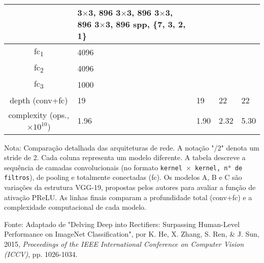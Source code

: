 \begin{table}
\begin{threeparttable}
\begin{tabular}{cllll}
              & \makecell[l]{3$\times$3, 896 \\ 3$\times$3, 896 \\ 3$\times$3, 896 \\ 3$\times$3, 896 \\ \addlinespace spp, \{7, 3, 2, 1\}} \\
            \midrule
            fc\textsubscript{1} & \multicolumn{4}{l}{4096} \\
            fc\textsubscript{2} & \multicolumn{4}{l}{4096} \\
            fc\textsubscript{3} & \multicolumn{4}{l}{1000} \\
            \midrule
            depth (conv+fc) & 19 & 19 & 22 & 22 \\
            complexity (ops., $\times 10^{10}$) & 1.96 & 1.90 & 2.32 & 5.30 \\
            \bottomrule
        \end{tabular}
        
        \begin{tablenotes}[para]
            \small
            \item[] Nota: Comparação detalhada das arquiteturas de rede. A notação "/2" denota um stride de 2. Cada coluna representa um modelo diferente. A tabela descreve a sequência de camadas convolucionais (no formato \texttt{kernel $\times$ kernel, n° de filtros}), de pooling e totalmente conectadas (fc). Os modelos A, B e C são variações da estrutura VGG-19, propostas pelos autores para avaliar a função de ativação PReLU. As linhas finais comparam a profundidade total (conv+fc) e a complexidade computacional de cada modelo.
            \item[] Fonte: Adaptado de "Delving Deep into Rectifiers: Surpassing Human-Level Performance on ImageNet Classification", por K. He, X. Zhang, S. Ren, \& J. Sun, 2015, \textit{Proceedings of the IEEE International Conference on Computer Vision (ICCV)}, pp. 1026-1034.
        \end{tablenotes}
        
    \end{threeparttable}
\end{table}

